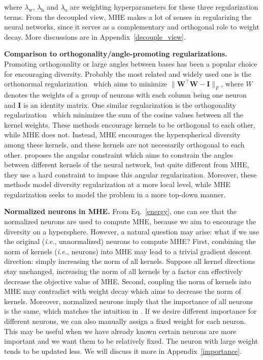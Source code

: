where $\lambda_{\text{w}}$, $\lambda_{\text{h}}$ and $\lambda_{\text{o}}$ are weighting hyperparameters for these three regularization terms. From the decoupled view, MHE makes a lot of senses in regularizing the neural networks, since it serves as a complementary and orthogonal role to weight decay. More discussions are in Appendix~\ref{decouple_view}.
\par
\textbf{Comparison to orthogonality/angle-promoting regularizations.} Promoting orthogonality or large angles between bases has been a popular choice for encouraging diversity. Probably the most related and widely used one is the orthonormal regularization~\cite{liu2017hyper} which aims to minimize $\|\bm{W}^\top\bm{W}-\bm{I}\|_F$, where $W$ denotes the weights of a group of neurons with each column being one neuron and $\bm{I}$ is an identity matrix. One similar regularization is the orthogonality regularization~\cite{rodriguez2017regularizing} which minimizes the sum of the cosine values between all the kernel weights. These methods encourage kernels to be orthogonal to each other, while MHE does not. Instead, MHE encourages the hyperspherical diversity among these kernels, and these kernels are not necessarily orthogonal to each other. \cite{xie2017learning} proposes the angular constraint which aims to constrain the angles between different kernels of the neural network, but quite different from MHE, they use a hard constraint to impose this angular regularization. Moreover, these methods model diversity regularization at a more local level, while MHE regularization seeks to model the problem in a more top-down manner.
\par
\textbf{Normalized neurons in MHE.} From Eq.~\ref{energy}, one can see that the normalized neurons are used to compute MHE, because we aim to encourage the diversity on a hypersphere. However, a natural question may arise: what if we use the original (\emph{i.e.}, unnormalized) neurons to compute MHE? First, combining the norm of kernels (\emph{i.e.}, neurons) into MHE may lead to a trivial gradient descent direction: simply increasing the norm of all kernels. Suppose all kernel directions stay unchanged, increasing the norm of all kernels by a factor can effectively decrease the objective value of MHE. Second, coupling the norm of kernels into MHE may contradict with weight decay which aims to decrease the norm of kernels. Moreover, normalized neurons imply that the importance of all neurons is the same, which matches the intuition in \cite{liu2017sphereface,liu2017hyper,liu2018decoupled}. If we desire different importance for different neurons, we can also manually assign a fixed weight for each neuron. This may be useful when we have already known certain neurons are more important and we want them to be relatively fixed. The neuron with large weight tends to be updated less. We will discuss it more in Appendix~\ref{importance}.

